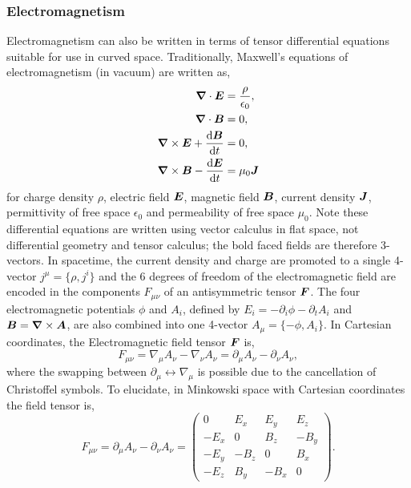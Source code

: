 \subsubsection{Electromagnetism}
Electromagnetism can also be written in terms of tensor differential equations
suitable for use in curved space. Traditionally, Maxwell's equations of
electromagnetism (in vacuum) are written as,
\begin{align}
\boldsymbol{\nabla} \cdot \boldsymbol{E} &= \frac{\rho}{\epsilon_0} ,\label{intro:eq:max1}\\
\boldsymbol{\nabla} \cdot \boldsymbol{B} &= 0 ,\label{intro:eq:max2}\\
\boldsymbol{\nabla} \times \boldsymbol{E}  + \frac{\dd \boldsymbol{B}}{\dd t} &=0,\label{intro:eq:max3}\\
\boldsymbol{\nabla} \times \boldsymbol{B} -\frac{\dd \boldsymbol{E}}{\dd t} &= \mu_0 \boldsymbol{J}\label{intro:eq:max4}
\end{align}
for charge density $\rho$, electric field $\boldsymbol{E}$, magnetic field $\boldsymbol{B}$, current density $\boldsymbol{J}$, permittivity of free space $\epsilon_0$ and permeability of free space $\mu_0$. Note these differential equations are written using vector calculus in flat space, not differential geometry and tensor calculus; the bold faced fields are therefore 3-vectors. In spacetime, the current density and charge are promoted to a single 4-vector $j^\mu = \{\rho,j^i\}$ and the 6 degrees of freedom of the electromagnetic field are encoded in the components $F_{\mu\nu}$ of an antisymmetric tensor $\boldsymbol{F}$. The four electromagnetic potentials $\phi$ and $A_i$, defined by $E_i = -\partial_i \phi - \partial_t A_i$ and $\boldsymbol{B} = \boldsymbol{\nabla}\times \boldsymbol{A}$, are also combined into one 4-vector $A_\mu = \{-\phi,A_i\}$. In Cartesian coordinates, the Electromagnetic field tensor $\boldsymbol{F}$ is,
\begin{equation}
F_{\mu\nu} = \nabla_\mu A_\nu - \nabla_\nu A_\nu = \partial_\mu A_\nu - \partial_\nu A_\nu ,
\end{equation}
where the swapping between $\partial_\mu \leftrightarrow \nabla_\mu$ is possible due to the cancellation of Christoffel symbols. To elucidate, in Minkowski space with Cartesian coordinates the field tensor is,
\begin{equation}
F_{\mu\nu} = \partial_\mu A_\nu - \partial_\nu A_\nu = \begin{pmatrix} 0 & E_x & E_y & E_z \\  -E_x & 0 & B_z & -B_y \\  -E_y & -B_z & 0 & B_x \\  -E_z & B_y & -B_x & 0 \end{pmatrix}.
\end{equation}
